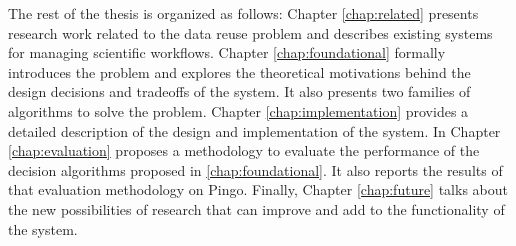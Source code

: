 The rest of the thesis is organized as follows: Chapter \ref{chap:related} presents research work related to the data reuse problem and describes existing systems for managing scientific workflows.  Chapter \ref{chap:foundational} formally introduces the problem and explores the theoretical motivations behind the design decisions and tradeoffs of the system. It also presents two families of algorithms to solve the problem. Chapter \ref{chap:implementation} provides a detailed description of the design and implementation of the system.  In Chapter \ref{chap:evaluation} proposes a methodology to evaluate the performance of the decision algorithms proposed in \ref{chap:foundational}.  It also reports the results of that evaluation methodology on Pingo.  Finally, Chapter \ref{chap:future} talks about the new possibilities of research that can improve and add to the functionality of the system.